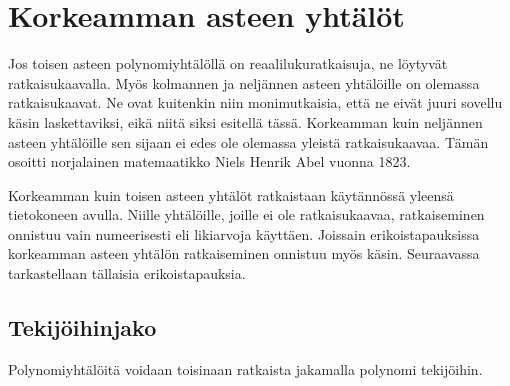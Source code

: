 \section{Korkeamman asteen yhtälöt}



Jos toisen asteen polynomiyhtälöllä on reaalilukuratkaisuja, ne löytyvät ratkaisukaavalla.
Myös kolmannen ja neljännen asteen yhtälöille on olemassa ratkaisukaavat.
Ne ovat kuitenkin niin monimutkaisia, että ne eivät juuri sovellu käsin laskettaviksi, eikä niitä siksi esitellä tässä.
Korkeamman kuin neljännen asteen yhtälöille sen sijaan ei edes ole olemassa yleistä ratkaisukaavaa.
Tämän osoitti norjalainen matemaatikko Niels Henrik Abel vuonna 1823.

Korkeamman kuin toisen asteen yhtälöt ratkaistaan käytännössä yleensä tietokoneen avulla.
Niille yhtälöille, joille ei ole ratkaisukaavaa, ratkaiseminen onnistuu vain numeerisesti eli likiarvoja käyttäen.
Joissain erikoistapauksissa korkeamman asteen yhtälön ratkaiseminen onnistuu myös käsin.
Seuraavassa tarkastellaan tällaisia erikoistapauksia.

\subsection*{Tekijöihinjako}

Polynomiyhtälöitä voidaan toisinaan ratkaista jakamalla polynomi tekijöihin.


